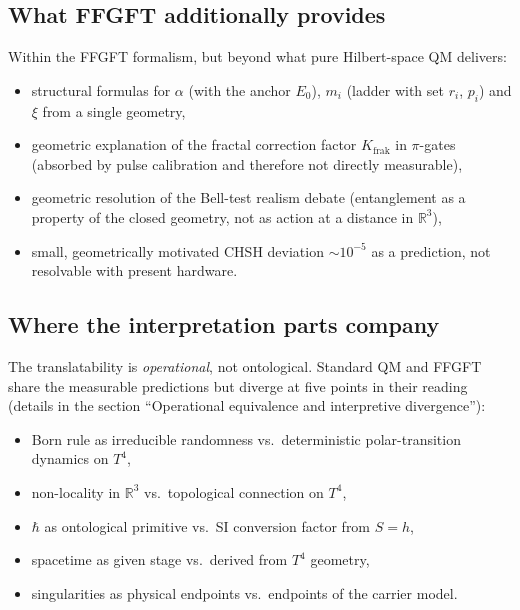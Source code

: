 \subsection*{What FFGFT additionally provides}

Within the FFGFT formalism, but beyond what pure Hilbert-space QM
delivers:

\begin{itemize}[leftmargin=2em,itemsep=2pt,topsep=2pt]
  \item structural formulas for $\alpha$ (with the anchor $E_0$),
        $m_i$ (ladder with set $r_i$, $p_i$) and $\xi$ from a
        single geometry,
  \item geometric explanation of the fractal correction factor
        $K_{\text{frak}}$ in $\pi$-gates (absorbed by pulse calibration and therefore not directly measurable),
  \item geometric resolution of the Bell-test realism debate
        (entanglement as a property of the closed geometry, not as action
        at a distance in $\mathbb{R}^3$),
  \item small, geometrically motivated CHSH deviation $\sim 10^{-5}$
        as a prediction, not resolvable with present hardware.
\end{itemize}

\subsection*{Where the interpretation parts company}

The translatability is \emph{operational}, not ontological. Standard
QM and FFGFT share the measurable predictions but diverge at five
points in their reading (details in the section ``Operational
equivalence and interpretive divergence''):

\begin{itemize}[leftmargin=2em,itemsep=2pt,topsep=2pt]
  \item Born rule as irreducible randomness vs.\ deterministic
        polar-transition dynamics on $T^4$,
  \item non-locality in $\mathbb{R}^3$ vs.\ topological connection
        on $T^4$,
  \item $\hbar$ as ontological primitive vs.\ SI conversion factor
        from $S=h$,
  \item spacetime as given stage vs.\ derived from $T^4$ geometry,
  \item singularities as physical endpoints vs.\ endpoints of the
        carrier model.
\end{itemize}

